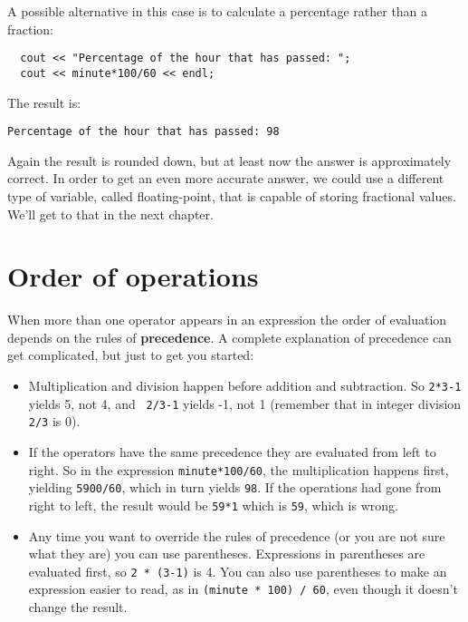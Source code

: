 A possible alternative in this case is to calculate a percentage
rather than a fraction:

\begin{lstlisting}
  cout << "Percentage of the hour that has passed: ";
  cout << minute*100/60 << endl;
\end{lstlisting}
%
The result is:

\begin{lstlisting}
Percentage of the hour that has passed: 98
\end{lstlisting}
%
Again the result is rounded down, but at least now the answer
is approximately correct.  In order to get an even more accurate
answer, we could use a different type of variable, called
floating-point, that is capable of storing fractional values.
We'll get to that in the next chapter.

\section{Order of operations}

When more than one operator appears in an expression the order
of evaluation depends on the rules of {\bf precedence}.  A
complete explanation of precedence can get complicated, but
just to get you started:

\begin{itemize}

\item Multiplication and division happen before
addition and subtraction.  So {\tt 2*3-1} yields 5, not 4, and {\tt
2/3-1} yields -1, not 1 (remember that in integer division {\tt 2/3}
is 0).

\item If the operators have the same precedence they are evaluated
from left to right.  So in the expression {\tt minute*100/60},
the multiplication happens first, yielding {\tt 5900/60}, which
in turn yields {\tt 98}.  If the operations had gone from right
to left, the result would be {\tt 59*1} which is {\tt 59}, which
is wrong.

\item Any time you want to override the rules of precedence (or
you are not sure what they are) you can use parentheses.  Expressions
in parentheses are evaluated first, so {\tt 2 * (3-1)} is 4.
You can also use parentheses to make an expression easier to
read, as in {\tt (minute * 100) / 60}, even though it doesn't
change the result.

\end{itemize}

